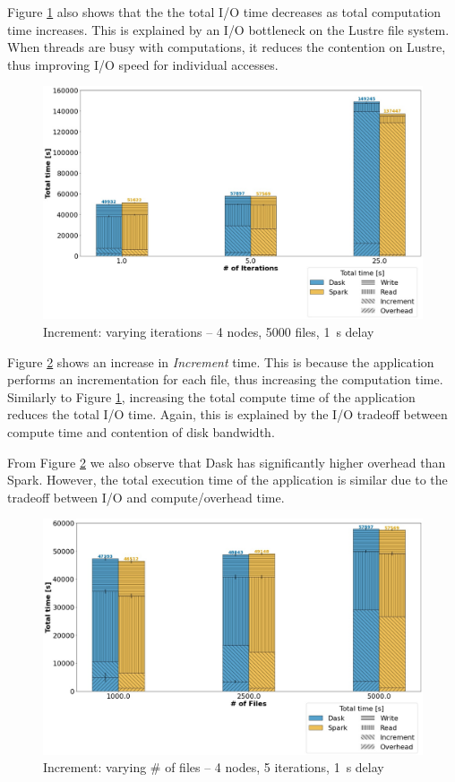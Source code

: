 \documentclass[conference]{IEEEtran}
\begin{document}
Figure \ref{fig:increment_itr} also shows that the the total I/O time decreases as total computation time increases.
This is explained by an I/O bottleneck on the Lustre file system.
When threads are busy with computations, it reduces the contention on Lustre, thus improving I/O speed for individual accesses.
\begin{figure}[!t]
	\centering
	\includegraphics[clip,width=\columnwidth]{figures/stacked_increment_itr.jpg}
	\caption{Increment: varying iterations -- 4 nodes, 5000 files, \SI{1}{\second} delay}
	\label{fig:increment_itr}
\end{figure}
		
Figure \ref{fig:increment_block} shows an increase in \textit{Increment} time.
This is because the application performs an incrementation for each file, thus increasing the computation time.
Similarly to Figure \ref{fig:increment_itr}, increasing the total compute time of the application reduces the total I/O time.
Again, this is explained by the I/O tradeoff between compute time and contention of disk bandwidth.

From Figure \ref{fig:increment_block} we also observe that Dask has significantly higher overhead than Spark.
However, the total execution time of the application is similar due to the tradeoff between I/O and compute/overhead time.
\begin{figure}[!t]
	\centering
	\includegraphics[clip,width=\columnwidth]{figures/stacked_increment_block.jpg}
	\caption{Increment: varying \# of files -- 4 nodes, 5 iterations, \SI{1}{\second} delay}
	\label{fig:increment_block}
\end{figure}
				
\end{document}
